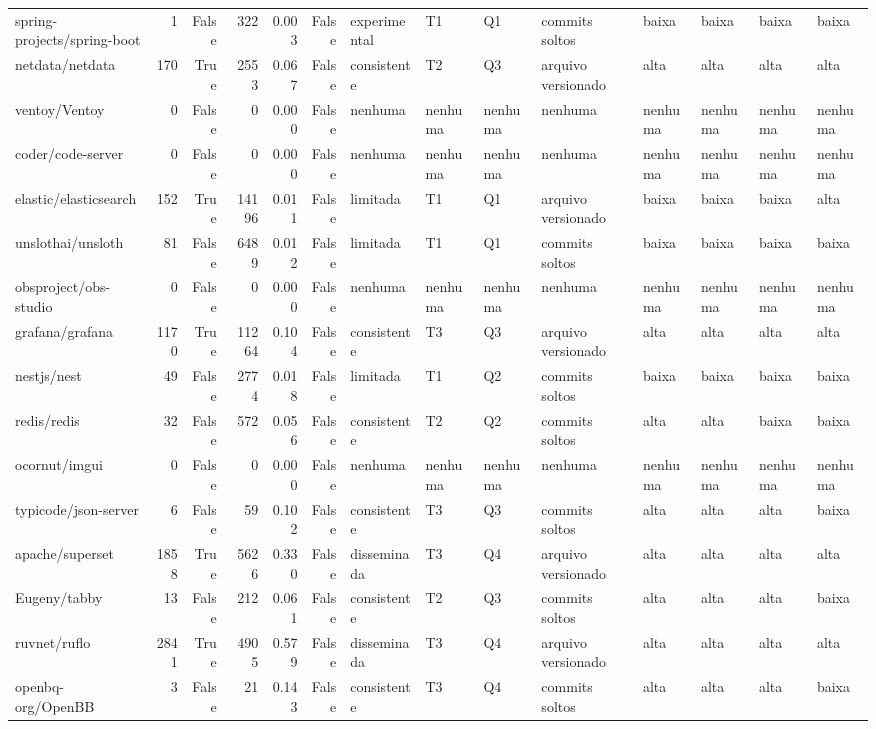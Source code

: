 \begin{tabular}{lrrrrrllllllll}
spring-projects/spring-boot & 1 & False & 322 & 0.003 & False & experimental & T1 & Q1 & commits soltos & baixa & baixa & baixa & baixa \\
netdata/netdata & 170 & True & 2553 & 0.067 & False & consistente & T2 & Q3 & arquivo versionado & alta & alta & alta & alta \\
ventoy/Ventoy & 0 & False & 0 & 0.000 & False & nenhuma & nenhuma & nenhuma & nenhuma & nenhuma & nenhuma & nenhuma & nenhuma \\
coder/code-server & 0 & False & 0 & 0.000 & False & nenhuma & nenhuma & nenhuma & nenhuma & nenhuma & nenhuma & nenhuma & nenhuma \\
elastic/elasticsearch & 152 & True & 14196 & 0.011 & False & limitada & T1 & Q1 & arquivo versionado & baixa & baixa & baixa & alta \\
unslothai/unsloth & 81 & False & 6489 & 0.012 & False & limitada & T1 & Q1 & commits soltos & baixa & baixa & baixa & baixa \\
obsproject/obs-studio & 0 & False & 0 & 0.000 & False & nenhuma & nenhuma & nenhuma & nenhuma & nenhuma & nenhuma & nenhuma & nenhuma \\
grafana/grafana & 1170 & True & 11264 & 0.104 & False & consistente & T3 & Q3 & arquivo versionado & alta & alta & alta & alta \\
nestjs/nest & 49 & False & 2774 & 0.018 & False & limitada & T1 & Q2 & commits soltos & baixa & baixa & baixa & baixa \\
redis/redis & 32 & False & 572 & 0.056 & False & consistente & T2 & Q2 & commits soltos & alta & alta & baixa & baixa \\
ocornut/imgui & 0 & False & 0 & 0.000 & False & nenhuma & nenhuma & nenhuma & nenhuma & nenhuma & nenhuma & nenhuma & nenhuma \\
typicode/json-server & 6 & False & 59 & 0.102 & False & consistente & T3 & Q3 & commits soltos & alta & alta & alta & baixa \\
apache/superset & 1858 & True & 5626 & 0.330 & False & disseminada & T3 & Q4 & arquivo versionado & alta & alta & alta & alta \\
Eugeny/tabby & 13 & False & 212 & 0.061 & False & consistente & T2 & Q3 & commits soltos & alta & alta & alta & baixa \\
ruvnet/ruflo & 2841 & True & 4905 & 0.579 & False & disseminada & T3 & Q4 & arquivo versionado & alta & alta & alta & alta \\
openbq-org/OpenBB & 3 & False & 21 & 0.143 & False & consistente & T3 & Q4 & commits soltos & alta & alta & alta & baixa \\

\end{tabular}
